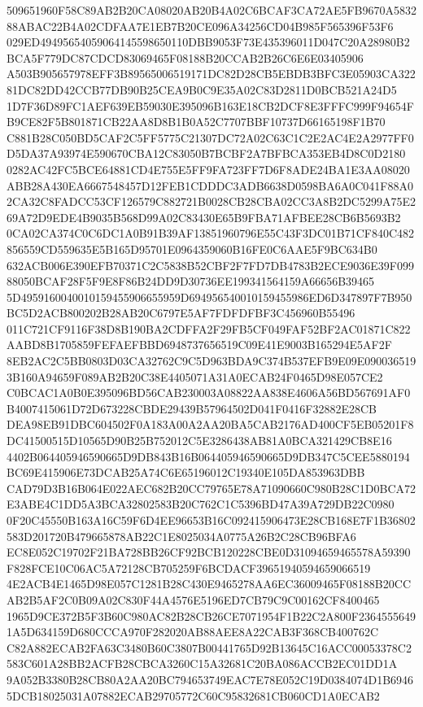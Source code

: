 \documentclass[UTF8,fontset=fandol,zihao=-4,a4paper]{ctexart}
\begin{document}
{{509651960F58C89AB2B20CA08020AB20B4A02C6BCAF3CA72AE5FB9670A583288ABAC22B4A02CDFAA7E1EB7B20CE096A34256CD04B985F565396F53F6
029ED49495654059064145598650110DBB9053F73E435396011D047C20A28980B2BCA5F779DC87CDCD83069465F08188B20CCAB2B26C6E6E03405906
A503B905657978EFF3B89565006519171DC82D28CB5EBDB3BFC3E05903CA32281DC82DD42CCB77DB90B25CEA9B0C9E35A02C83D2811D0BCB521A24D5
1D7F36D89FC1AEF639EB59030E395096B163E18CB2DCF8E3FFFC999F94654FB9CE82F5B801871CB22AA8D8B1B0A52C7707BBF10737D66165198F1B70
C881B28C050BD5CAF2C5FF5775C21307DC72A02C63C1C2E2AC4E2A2977FF0D5DA37A93974E590670CBA12C83050B7BCBF2A7BFBCA353EB4D8C0D2180
0282AC42FC5BCE64881CD4E755E5FF9FA723FF7D6F8ADE24BA1E3AA08020ABB28A430EA6667548457D12FEB1CDDDC3ADB6638D0598BA6A0C041F88A0
2CA32C8FADCC53CF126579C882721B0028CB28CBA02CC3A8B2DC5299A75E269A72D9EDE4B9035B568D99A02C83430E65B9FBA71AFBEE28CB6B5693B2
0CA02CA374C0C6DC1A0B91B39AF13851960796E55C43F3DC01B71CF840C482856559CD559635E5B165D95701E0964359060B16FE0C6AAE5F9BC634B0
632ACB006E390EFB70371C2C5838B52CBF2F7FD7DB4783B2ECE9036E39F09988050BCAF28F5F9E8F86B24DD9D30736EE199341564159A66656B39465
5D4959160040010159455906655959D694956540010159455986ED6D347897F7B950BC5D2ACB800202B28AB20C6797E5AF7FDFDFBF3C456960B55496
011C721CF9116F38D8B190BA2CDFFA2F29FB5CF049FAF52BF2AC01871C822AABD8B1705859FEFAEFBBD6948737656519C09E41E9003B165294E5AF2F
8EB2AC2C5BB0803D03CA32762C9C5D963BDA9C374B537EFB9E09E0900365193B160A94659F089AB2B20C38E4405071A31A0ECAB24F0465D98E057CE2
C0BCAC1A0B0E395096BD56CAB230003A08822AA838E4606A56BD567691AF0B4007415061D72D673228CBDE29439B57964502D041F0416F32882E28CB
DEA98EB91DBC604502F0A183A00A2AA20BA5CAB2176AD400CF5EB05201F8DC41500515D10565D90B25B752012C5E3286438AB81A0BCA321429CB8E16
4402B064405946590665D9DB843B16B064405946590665D9DB347C5CEE5880194BC69E415906E73DCAB25A74C6E65196012C19340E105DA853963DBB
CAD79D3B16B064E022AEC682B20CC79765E78A71090660C980B28C1D0BCA72E3ABE4C1DD5A3BCA32802583B20C762C1C5396BD47A39A729DB22C0980
0F20C45550B163A16C59F6D4EE96653B16C092415906473E28CB168E7F1B36802583D201720B479665878AB22C1E8025034A0775A26B2C28CB96BFA6
EC8E052C19702F21BA728BB26CF92BCB120228CBE0D31094659465578A59390F828FCE10C06AC5A72128CB705259F6BCDACF39651940594659066519
4E2ACB4E1465D98E057C1281B28C430E9465278AA6EC36009465F08188B20CCAB2B5AF2C0B09A02C830F44A4576E5196ED7CB79C9C00162CF8400465
1965D9CE372B5F3B60C980AC82B28CB26CE7071954F1B22C2A800F23645556491A5D634159D680CCCA970F282020AB88AEE8A22CAB3F368CB400762C
C82A882ECAB2FA63C3480B60C3807B00441765D92B13645C16ACC00053378C2583C601A28BB2ACFB28CBCA3260C15A32681C20BA086ACCB2EC01DD1A
9A052B3380B28CB80A2AA20BC794653749EAC7E78E052C19D0384074D1B69465DCB18025031A07882ECAB29705772C60C95832681CB060CD1A0ECAB2
}}
\end{document}
